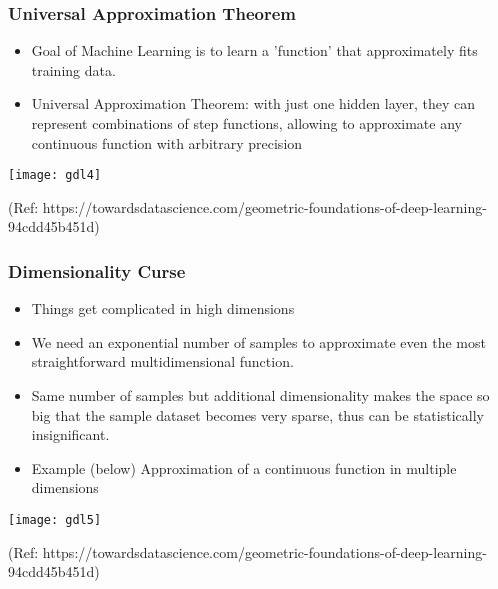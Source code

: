 \begin{frame}[fragile]\frametitle{Universal Approximation Theorem}

\begin{itemize}
\item Goal of Machine Learning is to learn a 'function' that approximately fits training data.
\item Universal Approximation Theorem: with just one hidden layer, they can represent combinations of step functions, allowing to approximate any continuous function with arbitrary precision
\end{itemize}
	  
\begin{center}
\texttt{[image: gdl4]}
\end{center}

{\tiny (Ref: https://towardsdatascience.com/geometric-foundations-of-deep-learning-94cdd45b451d)}		
\end{frame}

\begin{frame}[fragile]\frametitle{Dimensionality Curse}

\begin{itemize}
\item Things get complicated in high dimensions
\item We need an exponential number of samples to approximate even the most straightforward multidimensional function.
\item Same number of samples but additional dimensionality makes the space so big that the sample dataset becomes very sparse, thus can be statistically insignificant.
\item Example (below) Approximation of a continuous function in multiple dimensions
\end{itemize}
	  
\begin{center}
\texttt{[image: gdl5]}
\end{center}

{\tiny (Ref: https://towardsdatascience.com/geometric-foundations-of-deep-learning-94cdd45b451d)}		
\end{frame}

